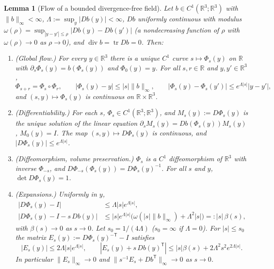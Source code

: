 \documentclass[11pt]{article}
\newtheorem{lemma}[theorem]{Lemma}
\theoremstyle{definition}
\theoremstyle{plain}
\newcommand{\R}{\mathbb R}
\newcommand{\norm}[1]{\lVert #1\rVert}
\begin{document}
\begin{lemma}[Flow of a bounded divergence-free field]\label{lem:flow}
Let $b\in C^1(\R^3;\R^3)$ with $\norm b_\infty<\infty$,
$\Lambda:=\sup_y|Db(y)|<\infty$, $Db$ uniformly continuous with modulus
$\omega(\rho)=\sup_{|y-y'|\le\rho}|Db(y)-Db(y')|$ (a nondecreasing
function of $\rho$ with $\omega(\rho)\to0$ as $\rho\to0$), and
$\operatorname{div}b=\operatorname{tr}Db=0$.  Then:
\begin{enumerate}
\item[(a)] (\emph{Global flow.})  For every $y\in\R^3$ there is a unique
 $C^1$ curve $s\mapsto\Phi_s(y)$ on $\R$ with $\partial_s\Phi_s(y)=b(\Phi_s(y))$
 and $\Phi_0(y)=y$.  For all $s,r\in\R$ and $y,y'\in\R^3$,
 \[
  \Phi_{s+r}=\Phi_s\circ\Phi_r,\qquad
  |\Phi_s(y)-y|\le|s|\norm b_\infty,\qquad
  |\Phi_s(y)-\Phi_s(y')|\le e^{\Lambda|s|}|y-y'| ,
 \]
 and $(s,y)\mapsto\Phi_s(y)$ is continuous on $\R\times\R^3$.
\item[(b)] (\emph{Differentiability.})  For each $s$, $\Phi_s\in C^1(\R^3;\R^3)$,
 and $M_s(y):=D\Phi_s(y)$ is the unique solution of the linear equation
 $\partial_sM_s(y)=Db(\Phi_s(y))M_s(y)$, $M_0(y)=I$.  The map
 $(s,y)\mapsto D\Phi_s(y)$ is continuous, and $|D\Phi_s(y)|\le e^{\Lambda|s|}$.
\item[(c)] (\emph{Diffeomorphism, volume preservation.})  $\Phi_s$ is a
 $C^1$ diffeomorphism of $\R^3$ with inverse $\Phi_{-s}$, and
 $D\Phi_{-s}(\Phi_s(y))=D\Phi_s(y)^{-1}$.  For all $s$ and $y$,
 $\det D\Phi_s(y)=1$.
\item[(d)] (\emph{Expansions.})  Uniformly in $y$,
 \begin{align}
  |D\Phi_s(y)-I|&\le\Lambda|s|e^{\Lambda|s|},
  \label{eq:qe-flow-first}\\
  |D\Phi_s(y)-I-s\,Db(y)|&\le|s|e^{\Lambda|s|}\bigl(\omega(|s|\norm b_\infty)+\Lambda^2|s|\bigr)
  =:|s|\,\beta(s),
  \label{eq:qe-flow-second}
 \end{align}
 with $\beta(s)\to0$ as $s\to0$.  Let $s_0=1/(4\Lambda)$ ($s_0=\infty$ if
 $\Lambda=0$).  For $|s|\le s_0$ the matrix
 $E_s(y):=D\Phi_s(y)^{-\mathsf T}-I$ satisfies
 \begin{equation}\label{eq:qe-flow-inverse}
  |E_s(y)|\le2\Lambda|s|e^{\Lambda|s|},
  \qquad
  |E_s(y)+s\,Db(y)^{\mathsf T}|\le|s|\beta(s)+2\Lambda^2s^2e^{2\Lambda|s|} .
 \end{equation}
 In particular $\norm{E_s}_\infty\to0$ and
 $\norm{s^{-1}E_s+Db^{\mathsf T}}_\infty\to0$ as $s\to0$.
\end{enumerate}
\end{lemma}
\end{document}

